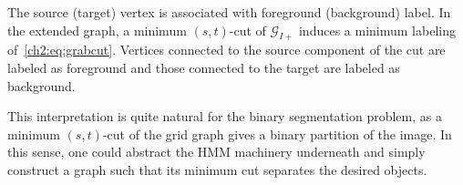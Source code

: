 The source (target) vertex is associated with foreground (background) label. In the extended graph, a minimum $(s,t)$-cut of $\mathcal{G}_{I+}$ induces a minimum labeling of~\cref{ch2:eq:grabcut}. Vertices connected to the source component of the cut are labeled as foreground and those connected to the target are labeled as background. 

This interpretation is quite natural for the binary segmentation problem, as a minimum $(s,t)$-cut of the grid graph gives a binary partition of the image. In this sense, one could abstract the HMM machinery underneath and simply construct a graph such that its minimum cut separates the desired objects.

\begin{figure}
\center
{}
\end{figure}
